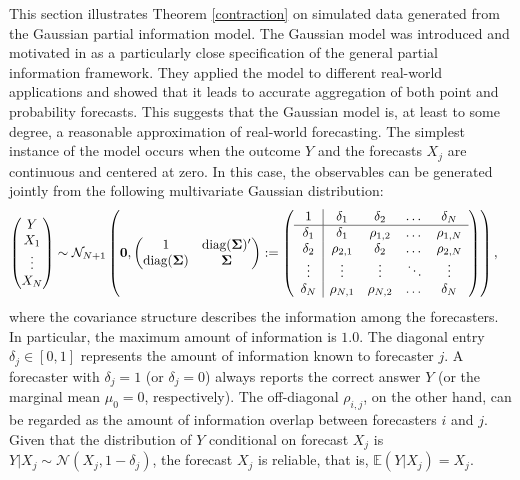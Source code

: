 \documentclass[11pt]{article}
\newcommand{\E}{\mathbb{E}}
\theoremstyle{definition}
\theoremstyle{definition}
\def\bSigma{{\bf \Sigma}}
\def\E{{\mathbb E}}
\def\diag{\text{diag}}
\def\diag{\text{diag}}
\begin{document}
This section illustrates Theorem \ref{contraction} on simulated data generated from the Gaussian partial information model. The Gaussian model was introduced and motivated in \cite{satopaamodeling2, satopaamodeling} as a particularly close specification of the general partial information framework. They applied the model to different real-world applications and showed that it leads to accurate aggregation of both point and probability forecasts. This suggests that the Gaussian model is, at least to some degree, a reasonable approximation of real-world forecasting. The simplest instance of the model occurs when the outcome $Y$ and the forecasts $X_j$ are continuous and centered at zero. In this case, the observables can be generated jointly from the following multivariate Gaussian distribution:
\begin{align}
\left(\begin{matrix} Y \\ X_{1}\\ \vdots \\ X_{N} \end{matrix}\right) &\sim \mathcal{N}_{N+1}\left( 
 \boldsymbol{0}, \left(\begin{matrix} 
1 & \diag(\bSigma)'\\
\diag(\bSigma) &\bSigma\\
 \end{matrix}\right) 
 :=
 \left(\begin{array}{c | c c cc }
1 & \delta_1 & \delta_2 & \dots & \delta_N  \\ \hline
\delta_1 & \delta_1 &\rho_{1,2} & \dots & \rho_{1,N}   \\ 
\delta_2 & \rho_{2,1} & \delta_2 & \dots & \rho_{2,N}  \\ 
\vdots & \vdots & \vdots & \ddots & \vdots  \\ 
\delta_N & \rho_{N,1} & \rho_{N,2} & \dots & \delta_N\\ 
 \end{array}\right)\right),  \label{NExperts}
\end{align}
where the covariance structure describes the information among the forecasters. In particular, the maximum amount of information is $1.0$. The diagonal entry $\delta_j \in [0,1]$ represents the amount of information known to forecaster $j$. A forecaster with $\delta_j = 1$ (or $\delta_j = 0$) always reports the correct answer $Y$ (or the marginal mean $\mu_0 = 0$, respectively). The off-diagonal $\rho_{i,j}$, on the other hand, can be regarded as the amount of information overlap between forecasters $i$ and $j$. Given that the distribution of $Y$ conditional on forecast $X_j$ is $Y|X_j \sim \mathcal{N}(X_j, 1-\delta_j)$, the forecast $X_j$ is reliable, that is, $\E(Y | X_j) = X_j$. 
\end{document}
